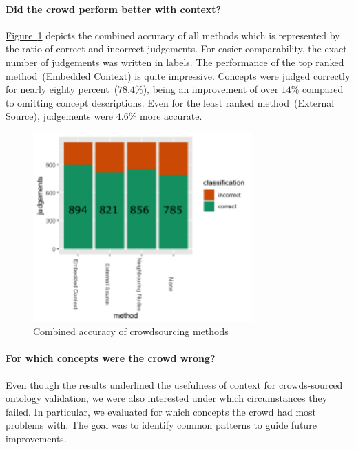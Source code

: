 \paragraph{Did the crowd perform better with context?}
\hyperref[fig:results_accuracy_combined]{Figure~\ref*{fig:results_accuracy_combined}} depicts the combined accuracy of all methods which is represented
by the ratio of correct and incorrect judgements. For easier comparability, the exact number of judgements was written in labels. The performance of the top ranked method~(Embedded Context) is quite impressive. Concepts were judged correctly for nearly eighty percent~($78.4\%$), being an improvement of over $14\%$ compared to omitting concept descriptions. Even for the least ranked method~(External Source), judgements were $4.6\%$ more accurate.   
\begin{figure}
	 \centering
	 \includegraphics[width=0.75\textwidth]{plots/comparison/barplot_all_judgements}
	 \caption{Combined accuracy of crowdsourcing methods}\label{fig:results_accuracy_combined}
\end{figure}

\paragraph{For which concepts were the crowd wrong?}
Even though the results underlined the usefulness of context for crowds-sourced ontology validation, we were also interested under which circumstances they failed. In particular, we evaluated for which concepts the crowd had most problems with. The goal was to identify common patterns to guide future improvements. 

